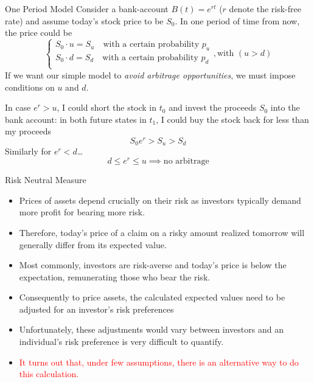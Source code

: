 \documentclass{beamer}
\begin{document}
\begin{frame}{One Period Model}
Consider a bank-account $B(t)=e^{rt}$ ($r$ denote the risk-free rate) and assume today's stock price to be $S_0$. In one period of time from now, the price could be 
\begin{equation*}
	\begin{cases}
		S_0\cdot u = S_u \quad\text{with a certain probability $p_u$} \\
		S_0\cdot d = S_d \quad\text{with a certain probability $p_d$}\\ 
	\end{cases}, \text{with }(u > d)
\end{equation*}
\pause
If we want our simple model to \emph{avoid arbitrage opportunities}, we must impose conditions on $u$ and $d$. 
\pause

In case $e^r > u$, I could short the stock in $t_0$ and invest the proceeds $S_0$ into the bank account: in both future states in $t_1$, I could buy the stock back for less than my proceeds 
\begin{equation*}
S_0e^r > S_u > S_d
\end{equation*} Similarly for $e^r < d$\ldots
\pause
\begin{equation*}
	\boxed{d\le e^r \le u \implies \text{no arbitrage}}
\end{equation*}
\end{frame}

\begin{frame}{Risk Neutral Measure}
	\begin{itemize}
		\item<1-> Prices of assets depend crucially on their risk as investors typically demand more profit for bearing more risk.
		\item<2-> Therefore, today's price of a claim on a risky amount realized tomorrow will generally differ from its expected value.
		\item<2-> Most commonly, investors are risk-averse and today's price is below the expectation, remunerating those who bear the risk.
		\item<4-> Consequently to price assets, the calculated expected values need to be adjusted for an investor's risk preferences
		\item<5-> Unfortunately, these adjustments would vary between investors and an individual's risk preference is very difficult to quantify.
		\item<6-> \textcolor{red}{It turns out that, under few assumptions, there is an alternative way to do this calculation.}
	\end{itemize}
\end{frame}
\end{document}
